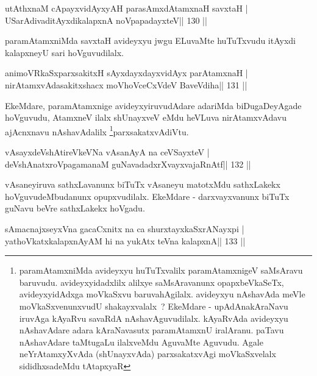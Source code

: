 \begin{shl}
utAthxnaM cApayxvidAyxyAH parasAmxdAtamxnaH savxtaH |
USarAdivaditAyxdikalapxnA noVpapadayxteV\hfill || 130 ||
\end{shl}

\begin{artha}
paramAtamxniMda savxtaH avideyxyu jwgu ELuvaMte huTuTxvudu itAyxdi kalapxneyU sari hoVguvudilalx.
\end{artha}

\begin{shl}
animoVRkaSxparxsakitxH sAyxdayxdayxvidAyx parAtamxnaH |
nirAtamxvAdasakitxshacx moVhoVceCxVdeV BaveVdiha\hfill || 131 ||
\end{shl}

\begin{artha}
EkeMdare, paramAtamxnige avideyxyiruvudAdare adariMda biDugaDeyAgade
hoVguvudu, AtamxneV ilalx shUnayxveV eMdu heVLuva nirAtamxvAdavu
ajAcnxnavu nAshavAdalilx \footnote{paramAtamxniMda avideyxyu
  huTuTxvalilx paramAtamxnigeV saMsAravu baruvudu. avideyxyidadxlilx
  alilxye saMsAravanunx opapxbeVkaSeTx, avideyxyidAdxga moVkaSxvu
  baruvahAgilalx. avideyxyu nAshavAda meVle
  moVkaSxvenunxvudU shakayxvalalx~? EkeMdare - upAdAnakAraNavu
  iruvAga kAyaRvu savaRdA nAshavAguvudilalx. kAyaRvAda avideyxyu
  nAshavAdare adara kAraNavasutx paramAtamxnU iralAranu. paTavu
  nAshavAdare taMtugaLu ilalxveMdu AguvaMte Aguvudu. Agale
  neYrAtamxyXvAda (shUnayxvAda) parxsakatxvAgi moVkaSxvelalx
  sididhxsadeMdu tAtapxyaR}parxsakatxvAdiVtu.
\end{artha}



\begin{shl}
vAsayxdeVshAtireVkeVNa vAsanAyA na ceVSayxteV |
deVshAnatxroVpagamanaM guNavadadxrXvayxvajaRnAtf\hfill || 132 ||
\end{shl}

\begin{artha}
vAsaneyiruva sathxLavanunx biTuTx vAsaneyu matotxMdu sathxLakekx hoVguvudeMbudanunx opupxvudilalx. EkeMdare - darxvayxvanunx biTuTx guNavu beVre sathxLakekx hoVgadu.
\end{artha}

\begin{shl}
sAmacnajxseyxVna gacaCxnitx na ca shurxtayxkaSxrANayxpi |
yathoVkatxkalapxnAyAM hi na yukAtx teVna kalapxnA\hfill || 133 ||
\end{shl}

